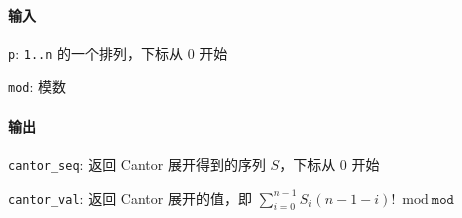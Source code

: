 \paragraph{输入}

\verb|p|: \verb|1..n| 的一个排列，下标从 \(0\) 开始

\verb|mod|: 模数

\paragraph{输出}

\verb|cantor_seq|: 返回 Cantor 展开得到的序列 \(S\)，下标从 \(0\) 开始

\verb|cantor_val|: 返回 Cantor 展开的值，即 \(\sum_{i=0}^{n-1}S_i(n-1-i)!\bmod \texttt{mod}\)
